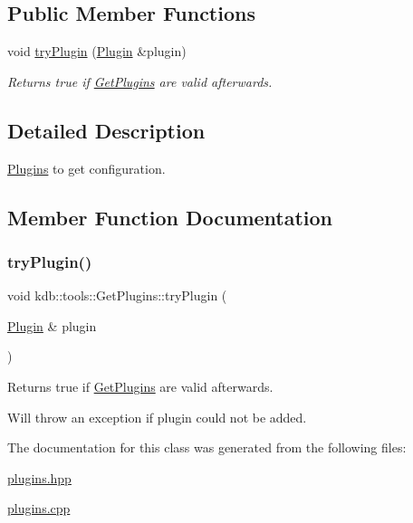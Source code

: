 \subsection*{Public Member Functions}
\begin{DoxyCompactItemize}
\item 
void \mbox{\hyperlink{classkdb_1_1tools_1_1GetPlugins_a175a3f9bb0054ff13537760fcb0fb861}{try\+Plugin}} (\mbox{\hyperlink{classkdb_1_1tools_1_1Plugin}{Plugin}} \&plugin)
\begin{DoxyCompactList}\small\item\em Returns true if \mbox{\hyperlink{classkdb_1_1tools_1_1GetPlugins}{Get\+Plugins}} are valid afterwards. \end{DoxyCompactList}\end{DoxyCompactItemize}


\subsection{Detailed Description}
\mbox{\hyperlink{classkdb_1_1tools_1_1Plugins}{Plugins}} to get configuration. 

\subsection{Member Function Documentation}
\mbox{\label{classkdb_1_1tools_1_1GetPlugins_a175a3f9bb0054ff13537760fcb0fb861}} 
\subsubsection{\texorpdfstring{tryPlugin()}{tryPlugin()}}
{\footnotesize\ttfamily void kdb\+::tools\+::\+Get\+Plugins\+::try\+Plugin (\begin{DoxyParamCaption}\item[{\mbox{\hyperlink{classkdb_1_1tools_1_1Plugin}{Plugin}} \&}]{plugin }\end{DoxyParamCaption})}



Returns true if \mbox{\hyperlink{classkdb_1_1tools_1_1GetPlugins}{Get\+Plugins}} are valid afterwards. 

Will throw an exception if plugin could not be added. 

The documentation for this class was generated from the following files\+:\begin{DoxyCompactItemize}
\item 
\mbox{\hyperlink{plugins_8hpp}{plugins.\+hpp}}\item 
\mbox{\hyperlink{plugins_8cpp}{plugins.\+cpp}}\end{DoxyCompactItemize}
